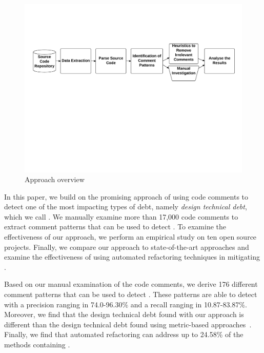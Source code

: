 \begin{figure}[thb!]
    \centering
    \label{fig:approach}
    \includegraphics[width=1\textwidth]{figures/Approach2}
    \vspace{-10mm}
    \caption{Approach overview}
\end{figure}


In this paper, we build on the promising approach of using code comments to detect one of the most impacting types of debt, namely \emph{design technical debt}, which we call \SADTD. We manually examine more than 17,000 code comments to extract comment patterns that can be used to detect \SADTD. To examine the effectiveness of our approach, we perform an empirical study on ten open source projects. Finally, we compare our approach to state-of-the-art approaches and examine the effectiveness of using automated refactoring techniques in mitigating \SADTD.

Based on our manual examination of the code comments, we derive 176 different comment patterns that can be used to detect \SADTD. These patterns are able to detect \SADTD with a precision ranging in 74.0-96.30\% and a recall ranging in 10.87-83.87\%. Moreover, we find that the design technical debt found with our approach is different than the design technical debt found using metric-based approaches~\cite{Zazworka2013CSE}. Finally, we find that automated refactoring can address up to 24.58\% of the methods containing \SADTD.



